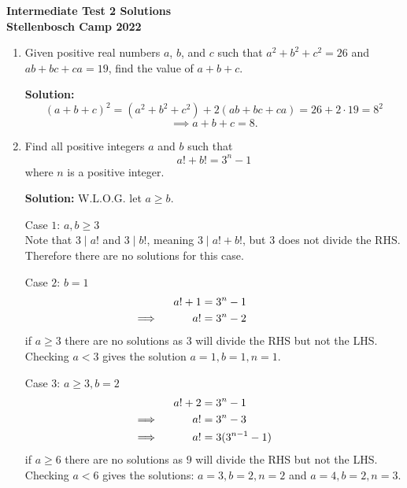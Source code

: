 \documentclass{article}
\begin{document}
\thispagestyle{empty}

\begin{center}
  \textbf{Intermediate Test 2 Solutions}
  \\ \vspace{1em}
  \textbf{\large Stellenbosch Camp 2022}
\end{center}

\bigskip

\begin{enumerate}[itemsep=24pt]

\item %
Given positive real numbers $a$, $b$, and $c$ such that $a^2+b^2+c^2 = 26$ and $ab+bc+ca = 19$, find the value of $a+b+c$.

\textbf{Solution:} 
\[(a+b+c)^2 = (a^2+b^2+c^2) + 2(ab + bc + ca) = 26 + 2\cdot 19 = 8^2\]
\[\implies a+b+c = 8.\]

\item
Find all positive integers $a$ and $b$ such that 
$$a! + b! = 3^n -1 $$
where $n$ is a positive integer.

\textbf{Solution:} 
W.L.O.G. let $a\geq b$.

Case $1$: $a,b\geq3$\\
Note that $3 \mid a!$ and $3 \mid b!$, meaning $3 \mid a!+b!$, but $3$ does not divide the RHS.
Therefore there are no solutions for this case.

Case $2$: $b=1$
\begin{align*}
    a!+1&=3^n-1\\
    \implies \hspace{10mm} a!&=3^n-2 \hspace{15mm}
\end{align*}
if $a\geq3$ there are no solutions as $3$ will divide the RHS but not the LHS. Checking $a<3$ gives the solution $a=1, b=1, n=1$.

Case $3$: $a\geq3, b=2$
\begin{align*}
    a!+2&=3^n-1\\
    \implies \hspace{10mm} a!&=3^n-3 \hspace{10mm} \\
    \implies \hspace{10mm} a!&=3(3^{n-1}-1) \hspace{7mm}
\end{align*}
if $a\geq6$ there are no solutions as $9$ will divide the RHS but not the LHS. Checking $a<6$ gives the solutions: $a=3, b=2, n=2$ and $a=4, b=2, n=3$.


\end{enumerate}
\end{document}
